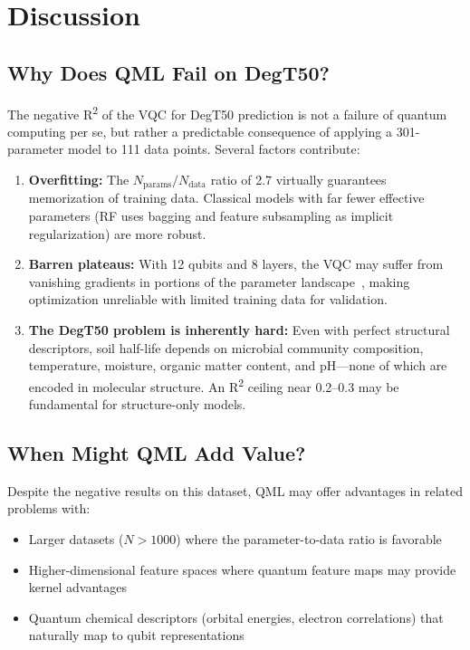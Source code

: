 \documentclass[12pt,a4paper]{article}
\newcommand{\degtl}{DegT50}
\newcommand{\rtwo}{R\textsuperscript{2}}
\newcommand{\nqubits}{12}
\newcommand{\nlayers}{8}
\newcommand{\nparams}{301}
\newcommand{\nsub}{111}
\begin{document}
\section{Discussion}
\label{sec:discussion}

\subsection{Why Does QML Fail on DegT50?}

The negative \rtwo{} of the VQC for \degtl{} prediction is not a failure
of quantum computing per se, but rather a predictable consequence of
applying a \nparams{}-parameter model to \nsub{} data points. Several
factors contribute:

\begin{enumerate}
  \item \textbf{Overfitting:} The $N_\text{params}/N_\text{data}$ ratio of
        2.7 virtually guarantees memorization of training data. Classical
        models with far fewer effective parameters (RF uses bagging and
        feature subsampling as implicit regularization) are more robust.

  \item \textbf{Barren plateaus:} With \nqubits{} qubits and \nlayers{}
        layers, the VQC may suffer from vanishing gradients in portions of
        the parameter landscape~\citep{mcclean2018}, making optimization
        unreliable with limited training data for validation.

  \item \textbf{The DegT50 problem is inherently hard:} Even with perfect
        structural descriptors, soil half-life depends on microbial
        community composition, temperature, moisture, organic matter
        content, and pH—none of which are encoded in molecular structure.
        An \rtwo{} ceiling near 0.2--0.3 may be fundamental for
        structure-only models.
\end{enumerate}

\subsection{When Might QML Add Value?}

Despite the negative results on this dataset, QML may offer advantages in
related problems with:
\begin{itemize}[nosep]
  \item Larger datasets ($N > 1000$) where the parameter-to-data ratio
        is favorable
  \item Higher-dimensional feature spaces where quantum feature maps
        may provide kernel advantages~\citep{havlicek2019}
  \item Quantum chemical descriptors (orbital energies, electron
        correlations) that naturally map to qubit representations
\end{itemize}
\end{document}
